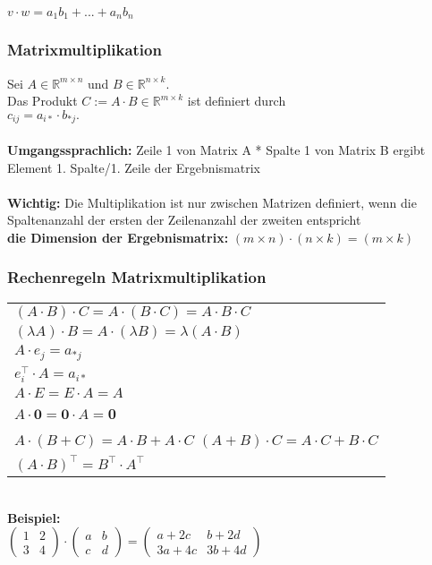 \documentclass[6pt,a4paper]{scrartcl}
\newcommand{\R}{\mathbb{R}}
\begin{document}
\begin{multicols*}{3}
$v \cdot w = a_1 b_1 + ... +a_n b_n$
\\
\subsubsection{Matrixmultiplikation}
Sei   $A \in \R^{m\times n}$   und   $B \in \R^{n\times k}.$\\
Das Produkt $C := A\cdot B \in \R^{m\times k}$ ist definiert durch\\
$c_{ij} = a_{i*} \cdot b_{*j}.$\\
\\
\textbf{Umgangssprachlich:} Zeile 1 von Matrix A * Spalte 1 von Matrix B ergibt Element 1. Spalte/1. Zeile der Ergebnismatrix\\
\\
\textbf{Wichtig:} Die Multiplikation ist nur zwischen Matrizen definiert, wenn die Spaltenanzahl der ersten der Zeilenanzahl der zweiten entspricht\\
\textbf{die Dimension der Ergebnismatrix:} $(m\times n)\cdot (n \times k) = (m \times k)$ \\
\subsubsection{Rechenregeln Matrixmultiplikation}
\begin{tabular}{l}
$(A \cdot B) \cdot C = A \cdot (B \cdot C)  = A \cdot B \cdot C$ \\
$(\lambda A) \cdot B = A \cdot (\lambda B)  = \lambda (A \cdot B)$ \\
$A \cdot e_j = a_{*j}$ \\
$e_i^\top \cdot A = a_{i*}$ \\
$A \cdot E = E \cdot A  = A$ \\
$A \cdot \textbf{0} = \textbf{0} \cdot A  = $\textbf{0} \\
$A \cdot(B + C) = A \cdot B + A \cdot C $ 
$(A+B) \cdot C = A \cdot C + B \cdot C $ \\
$(A \cdot B)^\top = B^\top \cdot A^\top $ \\
\end{tabular}
\\
\textbf{Beispiel:}\\
$
\begin{pmatrix}
1&2\\
3&4
\end{pmatrix}
\cdot
\begin{pmatrix}
a&b\\
c&d
\end{pmatrix}
=
\begin{pmatrix}
a + 2c & b +2d\\
3a + 4c & 3b + 4d
\end{pmatrix}
$

\end{multicols*}
\end{document}
